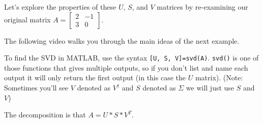 \documentclass{ximera}
\begin{document}
Let's explore the properties of these $U$, $S$, and $V$ matrices by re-examining our original matrix $A=\begin{bmatrix} 2 & -1 \\ 3 & 0\end{bmatrix}$.

The following video walks you through the main ideas of the next example.

\begin{center}
\end{center}

To find the SVD in MATLAB, use the syntax \texttt{[U, S, V]=svd(A)}. \texttt{svd()} is one of those functions that gives multiple outputs, so if you don't list and name each output it will only return the first output (in this case the $U$ matrix). (Note: Sometimes you'll see $V$ denoted as $V^\dagger$ and $S$ denoted as $\Sigma$ we will just use $S$ and $V$)

The decomposition is that $A=U*S*V^{T}$. 
\end{document}
